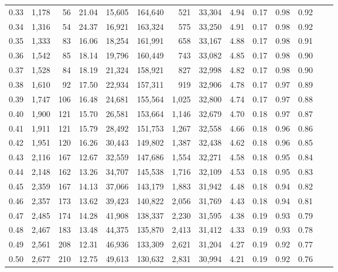 \begin{tabular}{rrrrrrrrrrrrrr}
0.33 &  1,178 &   56 &   21.04 &   15,605 &  164,640 &     521 &  33,304 &  4.94 &  0.17 &  0.98 &      0.92 \\
0.34 &  1,316 &   54 &   24.37 &   16,921 &  163,324 &     575 &  33,250 &  4.91 &  0.17 &  0.98 &      0.92 \\
0.35 &  1,333 &   83 &   16.06 &   18,254 &  161,991 &     658 &  33,167 &  4.88 &  0.17 &  0.98 &      0.91 \\
0.36 &  1,542 &   85 &   18.14 &   19,796 &  160,449 &     743 &  33,082 &  4.85 &  0.17 &  0.98 &      0.90 \\
0.37 &  1,528 &   84 &   18.19 &   21,324 &  158,921 &     827 &  32,998 &  4.82 &  0.17 &  0.98 &      0.90 \\
0.38 &  1,610 &   92 &   17.50 &   22,934 &  157,311 &     919 &  32,906 &  4.78 &  0.17 &  0.97 &      0.89 \\
0.39 &  1,747 &  106 &   16.48 &   24,681 &  155,564 &   1,025 &  32,800 &  4.74 &  0.17 &  0.97 &      0.88 \\
0.40 &  1,900 &  121 &   15.70 &   26,581 &  153,664 &   1,146 &  32,679 &  4.70 &  0.18 &  0.97 &      0.87 \\
0.41 &  1,911 &  121 &   15.79 &   28,492 &  151,753 &   1,267 &  32,558 &  4.66 &  0.18 &  0.96 &      0.86 \\
0.42 &  1,951 &  120 &   16.26 &   30,443 &  149,802 &   1,387 &  32,438 &  4.62 &  0.18 &  0.96 &      0.85 \\
0.43 &  2,116 &  167 &   12.67 &   32,559 &  147,686 &   1,554 &  32,271 &  4.58 &  0.18 &  0.95 &      0.84 \\
0.44 &  2,148 &  162 &   13.26 &   34,707 &  145,538 &   1,716 &  32,109 &  4.53 &  0.18 &  0.95 &      0.83 \\
0.45 &  2,359 &  167 &   14.13 &   37,066 &  143,179 &   1,883 &  31,942 &  4.48 &  0.18 &  0.94 &      0.82 \\
0.46 &  2,357 &  173 &   13.62 &   39,423 &  140,822 &   2,056 &  31,769 &  4.43 &  0.18 &  0.94 &      0.81 \\
0.47 &  2,485 &  174 &   14.28 &   41,908 &  138,337 &   2,230 &  31,595 &  4.38 &  0.19 &  0.93 &      0.79 \\
0.48 &  2,467 &  183 &   13.48 &   44,375 &  135,870 &   2,413 &  31,412 &  4.33 &  0.19 &  0.93 &      0.78 \\
0.49 &  2,561 &  208 &   12.31 &   46,936 &  133,309 &   2,621 &  31,204 &  4.27 &  0.19 &  0.92 &      0.77 \\
0.50 &  2,677 &  210 &   12.75 &   49,613 &  130,632 &   2,831 &  30,994 &  4.21 &  0.19 &  0.92 &      0.76 \\

\end{tabular}
